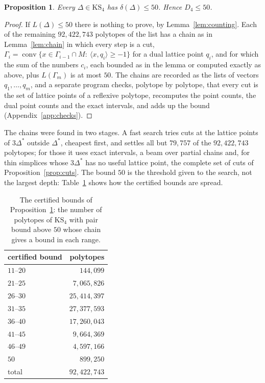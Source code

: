 \documentclass[11pt]{amsart}
\newtheorem{proposition}[theorem]{Proposition}
\theoremstyle{definition}
\theoremstyle{remark}
\newcommand{\KS}{\mathrm{KS}}
\newcommand{\ip}[2]{\langle #1,#2\rangle}
\newcommand{\conv}{\operatorname{conv}}
\newcommand{\UBs}{50}
\newcommand{\Nabove}{92{,}422{,}743}
\newcommand{\Nleft}{79{,}757}
\begin{document}
\begin{proposition}\label{prop:upper}
Every $\Delta\in\KS_4$ has $\delta(\Delta)\le\UBs$. Hence $D_4\le\UBs$.
\end{proposition}

\begin{proof}
If $L(\Delta)\le\UBs$ there is nothing to prove, by
Lemma~\ref{lem:counting}. Each of the remaining $\Nabove$ polytopes of the
list has a chain as in Lemma~\ref{lem:chain} in which every step is a cut,
$\Gamma_i=\conv\{x\in\Gamma_{i-1}\cap M:\ \ip{x}{q_i}\ge-1\}$ for a dual
lattice point $q_i$, and for which the sum of the numbers $c_i$, each
bounded as in the lemma or computed exactly as above, plus
$L(\Gamma_m)$ is at most $\UBs$. The chains are recorded as the lists of
vectors $q_1,\dots,q_m$, and a separate program checks, polytope by
polytope, that every cut is the set of lattice points of a reflexive
polytope, recomputes the point counts, the dual point counts and the exact
intervals, and adds up the bound (Appendix~\ref{app:checks}).
\end{proof}

The chains were found in two stages. A fast search tries cuts at the
lattice points of $3\Delta^*$ outside $\Delta^*$, cheapest first, and
settles all but $\Nleft$ of the $\Nabove$ polytopes; for those it uses
exact intervals, a beam over partial chains and, for thin simplices whose
$3\Delta^*$ has no useful lattice point, the complete set of cuts of
Proposition~\ref{prop:cuts}. The bound $\UBs$ is the threshold given to
the search, not the largest depth: Table~\ref{tab:upper} shows how the
certified bounds are spread.

\begin{table}[t]
\caption{The certified bounds of Proposition~\ref{prop:upper}: the number
of polytopes of $\KS_4$ with pair bound above $\UBs$ whose chain gives a
bound in each range.}\label{tab:upper}
\centering
\begin{tabular}{lr}
\toprule
certified bound & polytopes\\
\midrule
$11$--$20$ & $144{,}099$\\
$21$--$25$ & $7{,}065{,}826$\\
$26$--$30$ & $25{,}414{,}397$\\
$31$--$35$ & $27{,}377{,}593$\\
$36$--$40$ & $17{,}260{,}043$\\
$41$--$45$ & $9{,}664{,}369$\\
$46$--$49$ & $4{,}597{,}166$\\
$50$ & $899{,}250$\\
\midrule
total & $92{,}422{,}743$\\
\bottomrule
\end{tabular}
\end{table}
\end{document}
